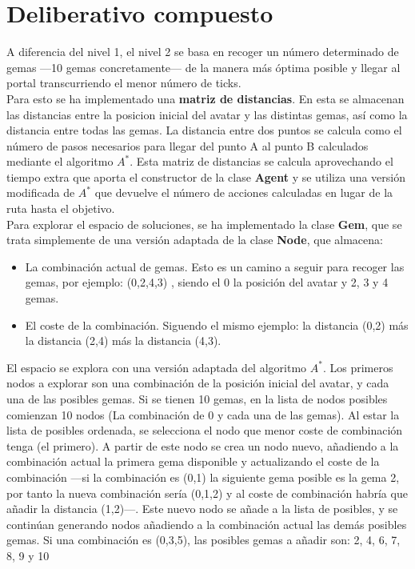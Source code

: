 \section{Deliberativo compuesto}
A diferencia del nivel 1, el nivel 2 se basa en recoger un número determinado de gemas ---10 gemas concretamente--- de la manera más óptima posible y llegar al portal transcurriendo el menor número de ticks.
\\
Para esto se ha implementado una \textbf{matriz de distancias}. En esta se almacenan las distancias entre la posicion inicial del avatar y las distintas gemas, así como la distancia entre todas las gemas. La distancia entre dos puntos se calcula como el número de pasos necesarios para llegar del punto A al punto B calculados mediante el algoritmo $ A^{*} $. Esta matriz de distancias se calcula aprovechando el tiempo extra que aporta el constructor de la clase \textbf{Agent} y se utiliza una versión modificada de $ A^{*} $ que devuelve el número de acciones calculadas en lugar de la ruta hasta el objetivo.\\
Para explorar el espacio de soluciones, se ha implementado la clase \textbf{Gem}, que se trata simplemente de una versión adaptada de la clase \textbf{Node}, que almacena:
\begin{itemize}
   \item La combinación actual de gemas. Esto es un camino a seguir para recoger las gemas, por ejemplo: (0,2,4,3) , siendo el 0 la posición del avatar y 2, 3 y 4 gemas.
   \item El coste de la combinación. Siguendo el mismo ejemplo: la distancia (0,2) más la distancia (2,4) más la distancia (4,3).
\end{itemize}
El espacio se explora con una versión adaptada del algoritmo $ A^{*} $. Los primeros nodos a explorar son una combinación de la posición inicial del avatar, y cada una de las posibles gemas. Si se tienen 10 gemas, en la lista de nodos posibles comienzan 10 nodos (La combinación de 0 y cada una de las gemas). Al estar la lista de posibles ordenada, se selecciona el nodo que menor coste de combinación tenga (el primero). A partir de este nodo se crea un nodo nuevo, añadiendo a la combinación actual la primera gema disponible y actualizando el coste de la combinación  ---si la combinación es (0,1) la siguiente gema posible es la gema 2, por tanto la nueva combinación sería (0,1,2) y al coste de combinación habría que añadir la distancia (1,2)---. Este nuevo nodo se añade a la lista de posibles, y se continúan generando nodos añadiendo a la combinación actual las demás posibles gemas. Si una combinación es (0,3,5), las posibles gemas a añadir son: 2, 4, 6, 7, 8, 9 y 10\\

